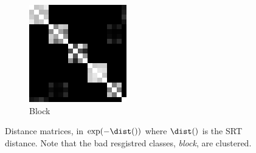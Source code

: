 \begin{figure}[ht]
\begin{subfigure}[b]{0.20\linewidth}
		\includegraphics[width=\linewidth]{fig/3dreg/reg3Dtrain_block.png} 
		\caption{Block}
	\end{subfigure}
	\caption{Distance matrices, in $\exp(-\dist())$ where $\dist()$ is the SRT distance. Note that the bad resgistred classes, \eg \emph{block}, are clustered.}
	\label{fig:3dreg_srtmatrices}
\end{figure}

